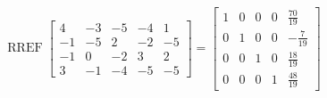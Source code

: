 \begin{exerciseAnswer} 


\[\operatorname{RREF} \left[\begin{array}{ccccc}
4 & -3 & -5 & -4 & 1 \\
-1 & -5 & 2 & -2 & -5 \\
-1 & 0 & -2 & 3 & 2 \\
3 & -1 & -4 & -5 & -5
\end{array}\right] = \left[\begin{array}{ccccc}
1 & 0 & 0 & 0 & \frac{70}{19} \\
0 & 1 & 0 & 0 & -\frac{7}{19} \\
0 & 0 & 1 & 0 & \frac{18}{19} \\
0 & 0 & 0 & 1 & \frac{48}{19}
\end{array}\right] \]



\end{exerciseAnswer}
